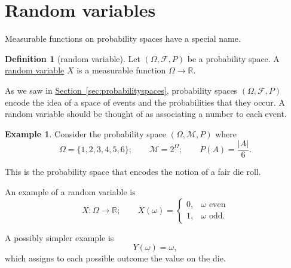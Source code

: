 \documentclass[a4paper,12pt]{scrreprt}
\newcommand{\R}{\mathbb{R}}
\newcommand{\defn}[1]{\ul{#1}}
\newcommand{\abs}[1]{\left|#1\right|}
\theoremstyle{definition}
\newtheorem{definition}{Definition}[section]
\newtheorem{example}{Example}[section]
\theoremstyle{plain}
\theoremstyle{remark}
\begin{document}
\section{Random variables}
Measurable functions on probability spaces have a special name.

\begin{definition}[random variable]
  \label{def:randomvariable}
  Let $(\Omega, \mathcal{F}, P)$ be a probability space. A \defn{random variable} $X$ is a measurable function $\Omega \to \R$.
\end{definition}

As we saw in \hyperref[sec:probabilityspaces]{Section~\ref*{sec:probabilityspaces}}, probability spaces $(\Omega, \mathcal{F}, P)$ encode the idea of a space of events and the probabilities that they occur. A random variable should be thought of as associating a number to each event.

\begin{example}
  Consider the probability space $(\Omega, \mathcal{M}, P)$ where
  \begin{equation*}
    \Omega = \{ 1, 2, 3, 4, 5, 6 \};\qquad \mathcal{M} = 2^{\Omega};\qquad P(A) = \frac{\abs{A}}{6}.
  \end{equation*}

  This is the probability space that encodes the notion of a fair die roll.

  An example of a random variable is
  \begin{equation*}
    X\colon \Omega \to \R;\qquad X(\omega) =
    \begin{cases}
      0, &\omega\text{ even} \\
      1, &\omega\text{ odd}.
    \end{cases}
  \end{equation*}

  A possibly simpler example is
  \begin{equation*}
    Y(\omega) = \omega,
  \end{equation*}
  which assigns to each possible outcome the value on the die.
\end{example}
\end{document}
